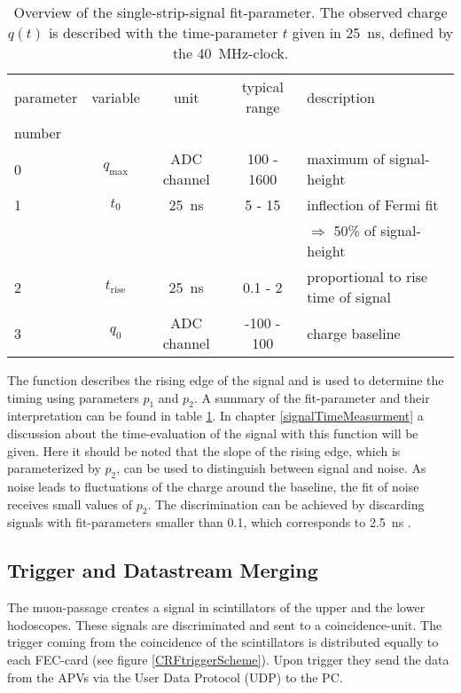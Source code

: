 \documentclass[
twoside,            %
BCOR1.4cm,          %
10pt,               %
headings=normal,    %
headsepline,        %
clearplainpage,		%
final,              %
div=14,
open=right,
bibliography=toc
]{scrreprt}
\begin{document}
\begin{table}[!h]
				
	\begin{tabular}{lcccl}
		\hline
		\hline
		parameter & variable & unit & typical range & description
		\\
		number &  &  &  & 
		\\
		\hline
		0 & $q_{\mathrm{max}}$ & ADC channel & 100 - 1600 & maximum of signal-height
		\\
		1 & $t_{0}$ & \SI{25}{ns} & 5 - 15 & inflection of Fermi fit
		\\
		 &  &  &  & $\Rightarrow$ 50\% of signal-height
		\\
		2 & $t_{\mathrm{rise}}$ & \SI{25}{ns} & 0.1 - 2 & proportional to rise time of signal
		\\
		3 & $q_{0}$ & ADC channel & -100 - 100 & charge baseline
		\\
		\hline
		\hline
	\end{tabular}
	\vspace{-2mm}
	\caption{
		Overview of the single-strip-signal fit-parameter.
		The observed charge $q(t)$ is described with the time-parameter $t$ given in \SI{25}{ns}, defined by the \SI{40}{MHz}-clock.
	}
	\label{inverseFermiFunction}
\end{table}

The function describes the rising edge of the signal and is used to determine the timing using parameters $p_{1}$ and $p_{2}$.
A summary of the fit-parameter and their interpretation can be found in table \ref{inverseFermiFunction}.
In chapter \ref{signalTimeMeasurment} a discussion about the time-evaluation of the signal with this function will be given.
Here it should be noted that the slope of the rising edge, which is parameterized by $p_{2}$, can be used to distinguish between signal and noise.
As noise leads to fluctuations of the charge around the baseline, the fit of noise receives small values of $p_{2}$.
The discrimination can be achieved by discarding signals with fit-parameters smaller than 0.1, which corresponds to \SI{2.5}{ns} \cite{loeselMaster}.

\subsection{Trigger and Datastream Merging}

The muon-passage creates a signal in scintillators of the upper and the lower hodoscopes.
These signals are discriminated and sent to a coincidence-unit.
The trigger coming from the coincidence of the scintillators is distributed equally to each FEC-card (see figure \ref{CRFtriggerScheme}).
Upon trigger they send the data from the APVs via the User Data Protocol (UDP) to the PC.
\end{document}
